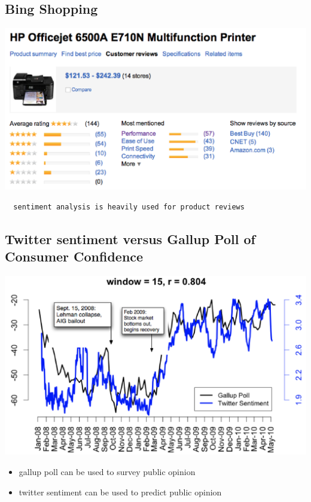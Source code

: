 \documentclass[11pt]{article}
\theoremstyle{definition}
\begin{document}
\subsection{Bing Shopping}
\includegraphics[width=\textwidth]{6.png}
\begin{verbatim}
  sentiment analysis is heavily used for product reviews
\end{verbatim}

\subsection{Twitter sentiment versus Gallup Poll of
Consumer Confidence}
\includegraphics[width=\textwidth]{7.png}
\begin{itemize}
  \item gallup poll can be used to survey public opinion
  \item twitter sentiment can be used to predict public opinion
\end{itemize}
\end{document}
